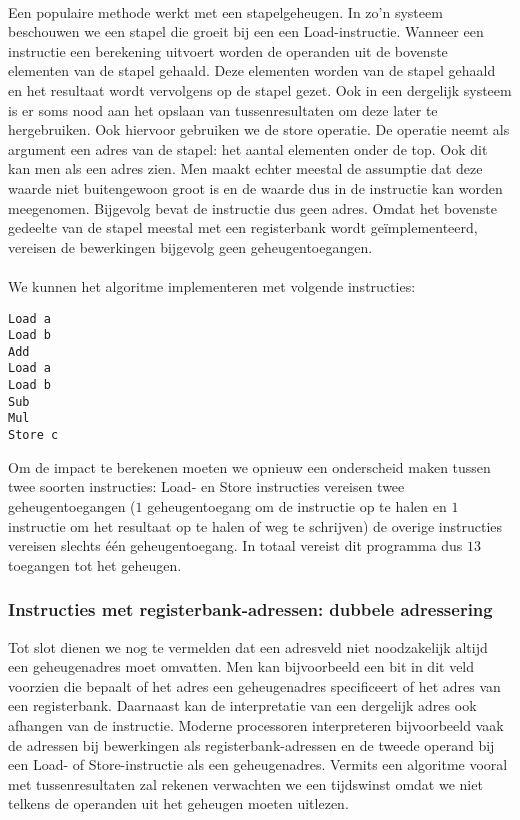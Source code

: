 \paragraph{}
Een populaire methode werkt met een stapelgeheugen. In zo'n systeem beschouwen we een stapel die groeit bij een een Load-instructie. Wanneer een instructie een berekening uitvoert worden de operanden uit de bovenste elementen van de stapel gehaald. Deze elementen worden van de stapel gehaald en het resultaat wordt vervolgens op de stapel gezet. Ook in een dergelijk systeem is er soms nood aan het opslaan van tussenresultaten om deze later te hergebruiken. Ook hiervoor gebruiken we de store operatie. De operatie neemt als argument een adres van de stapel: het aantal elementen onder de top. Ook dit kan men als een adres zien. Men maakt echter meestal de assumptie dat deze waarde niet buitengewoon groot is en de waarde dus in de instructie kan worden meegenomen. Bijgevolg bevat de instructie dus geen adres. Omdat het bovenste gedeelte van de stapel meestal met een registerbank wordt ge\"implementeerd, vereisen de bewerkingen bijgevolg geen geheugentoegangen.
\paragraph{}
We kunnen het algoritme implementeren met volgende instructies:
\begin{verbatim}
Load a
Load b
Add
Load a
Load b
Sub
Mul
Store c
\end{verbatim}
Om de impact te berekenen moeten we opnieuw een onderscheid maken tussen twee soorten instructies: Load- en Store instructies vereisen twee geheugentoegangen ($1$ geheugentoegang om de instructie op te halen en $1$ instructie om het resultaat op te halen of weg te schrijven) de overige instructies vereisen slechts \'e\'en geheugentoegang. In totaal vereist dit programma dus $13$ toegangen tot het geheugen.
\subsubsection{Instructies met registerbank-adressen: dubbele adressering}
Tot slot dienen we nog te vermelden dat een adresveld niet noodzakelijk altijd een geheugenadres moet omvatten. Men kan bijvoorbeeld een bit in dit veld voorzien die bepaalt of het adres een geheugenadres specificeert of het adres van een registerbank. Daarnaast kan de interpretatie van een dergelijk adres ook afhangen van de instructie. Moderne processoren interpreteren bijvoorbeeld vaak de adressen bij bewerkingen als registerbank-adressen en de tweede operand bij een Load- of Store-instructie als een geheugenadres. Vermits een algoritme vooral met tussenresultaten zal rekenen verwachten we een tijdswinst omdat we niet telkens de operanden uit het geheugen moeten uitlezen.
